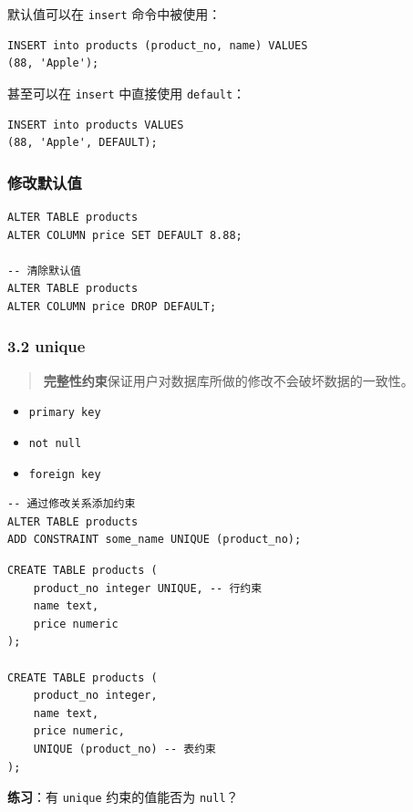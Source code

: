 \documentclass[aspectratio=169, 14pt]{beamer}
\begin{document}
\begin{frame}[fragile]
    默认值可以在 \texttt{insert} 命令中被使用：

    \begin{verbatim}
INSERT into products (product_no, name) VALUES
(88, 'Apple');
    \end{verbatim}

甚至可以在 \texttt{insert} 中直接使用 \texttt{default}：

\begin{verbatim}
INSERT into products VALUES
(88, 'Apple', DEFAULT);
\end{verbatim}

\end{frame}

\begin{frame}[fragile]
    \frametitle{修改默认值}

    \begin{verbatim}
ALTER TABLE products 
ALTER COLUMN price SET DEFAULT 8.88;

-- 清除默认值
ALTER TABLE products 
ALTER COLUMN price DROP DEFAULT;
    \end{verbatim}
    
\end{frame}

\begin{frame}[fragile]
    \frametitle{3.2 unique}

\begin{quote}
    \textbf{完整性约束}保证用户对数据库所做的修改不会破坏数据的一致性。
\end{quote}

\begin{itemize}
    \item \texttt{primary key}
    \item \texttt{not null}
    \item \texttt{foreign key}
\end{itemize}
\pause

\begin{verbatim}
-- 通过修改关系添加约束
ALTER TABLE products 
ADD CONSTRAINT some_name UNIQUE (product_no);
\end{verbatim}

\end{frame}

\begin{frame}[fragile]

    \begin{verbatim}
CREATE TABLE products (
    product_no integer UNIQUE, -- 行约束
    name text,
    price numeric
);

CREATE TABLE products (
    product_no integer,
    name text,
    price numeric,
    UNIQUE (product_no) -- 表约束
);
    \end{verbatim} 

    {\large {}}  \textbf{练习}：有 \texttt{unique} 约束的值能否为 \texttt{null}？

\end{frame}
\end{document}
